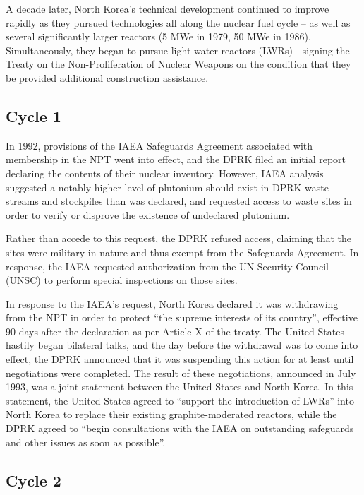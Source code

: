 \documentclass{article}
\begin{document}
A decade later, North Korea’s technical development continued to improve rapidly as they pursued technologies all along the nuclear fuel cycle – as well as several significantly larger reactors (5 MWe in 1979\cite{ntiYongbyon}, 50 MWe in 1986\cite{ntiYongbyon2}). Simultaneously, they began to pursue light water reactors (LWRs) - signing the Treaty on the Non-Proliferation of Nuclear Weapons on the condition that they be provided additional construction assistance\cite{nti15}.   

\subsection{Cycle 1}

In 1992, provisions of the IAEA Safeguards Agreement associated with membership in the NPT went into effect, and the DPRK filed an initial report declaring the contents of their nuclear inventory\cite{iaea92}. However, IAEA analysis suggested a notably higher level of plutonium should exist in DPRK waste streams and stockpiles than was declared, and requested access to waste sites in order to verify or disprove the existence of undeclared plutonium\cite{iaea09}. 

Rather than accede to this request, the DPRK refused access, claiming that the sites were military in nature and thus exempt from the Safeguards Agreement\cite{nti15,iaea09}. In response, the IAEA requested authorization from the UN Security Council (UNSC) to perform special inspections on those sites\cite{nti15}.
 
In response to the IAEA’s request, North Korea declared it was withdrawing from the NPT in order to protect “the supreme interests of its country”, effective 90 days after the declaration as per Article X of the treaty\cite{npt}. The United States hastily began bilateral talks, and the day before the withdrawal was to come into effect, the DPRK announced that it was suspending this action for at least until negotiations were completed\cite{nti15}. The result of these negotiations, announced in July 1993, was a joint statement between the United States and North Korea. In this statement, the United States agreed to “support the introduction of LWRs” into North Korea to replace their existing graphite-moderated reactors, while the DPRK agreed to “begin consultations with the IAEA on outstanding safeguards and other issues as soon as possible”\cite{hayes}. 

\subsection{Cycle 2}
\end{document}
